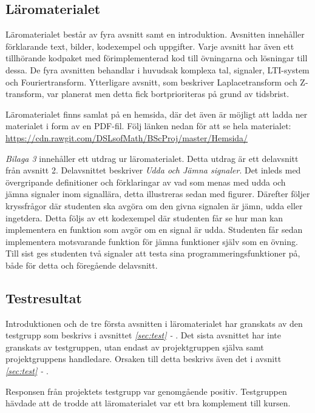 \documentclass[12pt,a4paper,twoside,openright]{article}
\begin{document}

\subsection{Läromaterialet}

Läromaterialet består av fyra avsnitt samt en introduktion. Avsnitten
innehåller förklarande text, bilder, kodexempel och uppgifter. Varje
avsnitt har även ett tillhörande kodpaket med förimplementerad kod
till övningarna och lösningar till dessa. De fyra avsnitten behandlar
i huvudsak komplexa tal, signaler, LTI-system och Fouriertransform.
Ytterligare avsnitt, som beskriver Laplacetransform och
Z-transform, var planerat men detta fick bortprioriteras på grund av
tidsbrist.

Läromaterialet finns samlat på en hemsida, där det även är möjligt att
ladda ner materialet i form av en PDF-fil. Följ länken nedan för att
se hela materialet:
\url{https://cdn.rawgit.com/DSLsofMath/BScProj/master/Hemsida/}


\textit{Bilaga 3} innehåller ett utdrag ur läromaterialet. Detta
utdrag är ett delavsnitt från avsnitt 2. Delavsnittet beskriver
\textit{Udda och Jämna signaler}. Det inleds med övergripande
definitioner och förklaringar av vad som menas med udda och jämna
signaler inom signallära, detta illustreras sedan med
figurer. Därefter följer kryssfrågor där studenten ska avgöra om den
givna signalen är jämn, udda eller ingetdera. Detta följs av ett
kodexempel där studenten får se hur man kan implementera en funktion
som avgör om en signal är udda. Studenten får sedan implementera
motsvarande funktion för jämna funktioner själv som en övning. Till
sist ges studenten två signaler att testa sina
programmeringsfunktioner på, både för detta och föregående delavsnitt.


\subsection{Testresultat}
\label{sec:testResultat}
Introduktionen och de tre första avsnitten i läromaterialet har
granskats av den testgrupp som beskrivs i avsnittet \textit{\ref{sec:test} - }. Det sista avsnittet har inte granskats av
testgruppen, utan endast av projektgruppen själva samt projektgruppens
handledare. Orsaken till detta beskrivs även det i avsnitt \textit{\ref{sec:test}
  - }.

Responsen från projektets testgrupp var genomgående
positiv. Testgruppen hävdade att de trodde att läromaterialet var ett
bra komplement till kursen.
\end{document}
